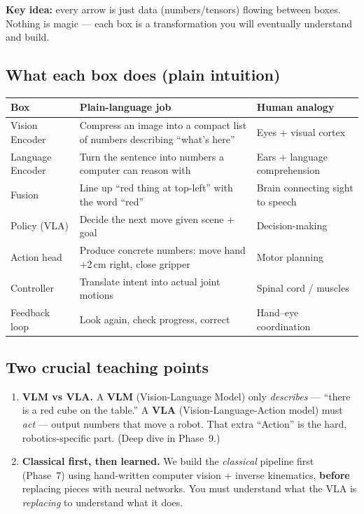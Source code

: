 \documentclass[11pt]{article}
\begin{document}
\textbf{Key idea:} every arrow is just data (numbers/tensors) flowing between
boxes. Nothing is magic --- each box is a transformation you will eventually
understand and build.

\subsection{What each box does (plain intuition)}

\begin{center}
\begin{tabular}{@{}p{3cm}p{6.5cm}p{3.5cm}@{}}
\toprule
\textbf{Box} & \textbf{Plain-language job} & \textbf{Human analogy} \\
\midrule
Vision Encoder   & Compress an image into a compact list of numbers describing ``what's here'' & Eyes + visual cortex \\
Language Encoder & Turn the sentence into numbers a computer can reason with & Ears + language comprehension \\
Fusion           & Line up ``red thing at top-left'' with the word ``red'' & Brain connecting sight to speech \\
Policy (VLA)     & Decide the next move given scene + goal & Decision-making \\
Action head      & Produce concrete numbers: move hand +2\,cm right, close gripper & Motor planning \\
Controller       & Translate intent into actual joint motions & Spinal cord / muscles \\
Feedback loop    & Look again, check progress, correct & Hand--eye coordination \\
\bottomrule
\end{tabular}
\end{center}

\subsection{Two crucial teaching points}

\begin{enumerate}[leftmargin=*]
  \item \textbf{VLM vs VLA.} A \textbf{VLM} (Vision-Language Model) only
  \emph{describes} --- ``there is a red cube on the table.'' A \textbf{VLA}
  (Vision-Language-Action model) must \emph{act} --- output numbers that move a
  robot. That extra ``Action'' is the hard, robotics-specific part.
  (Deep dive in Phase~9.)
  \item \textbf{Classical first, then learned.} We build the \emph{classical}
  pipeline first (Phase~7) using hand-written computer vision + inverse
  kinematics, \textbf{before} replacing pieces with neural networks. You must
  understand what the VLA is \emph{replacing} to understand what it does.
\end{enumerate}
\end{document}
